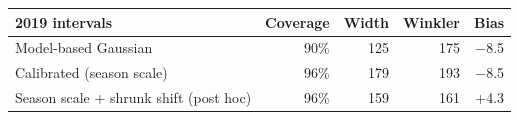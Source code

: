 \begin{tabular}{|l|r|r|r|r|}
\hline
\textbf{2019 intervals} & \textbf{Coverage} & \textbf{Width} & \textbf{Winkler} & \textbf{Bias} \\\hline
Model-based Gaussian & 90\% & 125 & 175 & $-$8.5 \\\hline
Calibrated (season scale) & 96\% & 179 & 193 & $-$8.5 \\\hline
Season scale + shrunk shift (post hoc) & 96\% & 159 & 161 & +4.3 \\\hline
\end{tabular}
